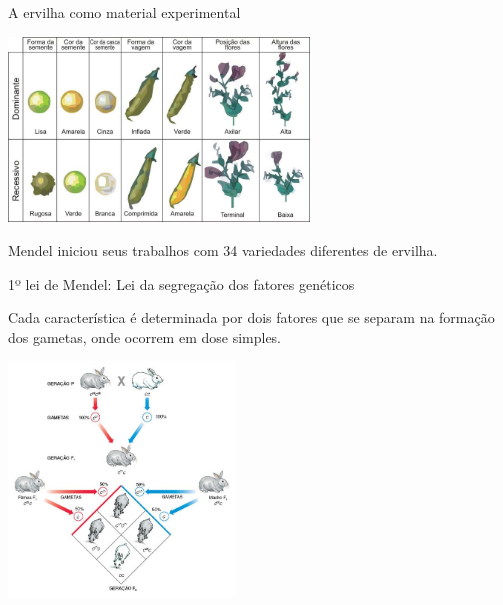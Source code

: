 \documentclass[]{beamer}
\begin{document}
  \begin{frame}{A ervilha como material experimental}
    \begin{center}
      \includegraphics[width=8cm]{images/ervilha.png}

      \hspace{0.5cm}

      Mendel iniciou seus trabalhos com 34 variedades diferentes de ervilha.
    \end{center}
  \end{frame}

  \begin{frame}{1º lei de Mendel: Lei da segregação dos fatores genéticos}
    \begin{center}
      Cada característica é determinada por dois fatores que se separam na formação dos gametas, onde ocorrem em dose simples.

      \hspace{0.5cm}

      \includegraphics[width=6cm]{images/coelhos.png}
    \end{center}
  \end{frame}
\end{document}
